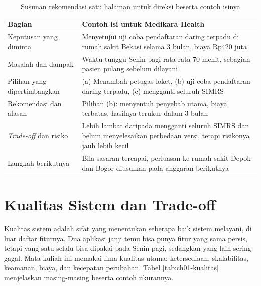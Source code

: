 \begin{table}[!htb]
  \centering
  \footnotesize
  \caption{Susunan rekomendasi satu halaman untuk direksi beserta contoh isinya}
  \label{tab:ch01-rekomendasi}
  \begin{tabularx}{\textwidth}{P{2.6cm}L}
    \hline
    \textbf{Bagian} & \textbf{Contoh isi untuk Medikara Health} \\
    \hline
    Keputusan yang diminta & Menyetujui uji coba pendaftaran daring terpadu di rumah
      sakit Bekasi selama 3 bulan, biaya Rp420 juta \\
    \hline
    Masalah dan dampak & Waktu tunggu Senin pagi rata-rata 70 menit, sebagian pasien
      pulang sebelum dilayani \\
    \hline
    Pilihan yang dipertimbangkan & (a) Menambah petugas loket, (b) uji coba pendaftaran
      daring terpadu, (c) mengganti seluruh SIMRS \\
    \hline
    Rekomendasi dan alasan & Pilihan (b): menyentuh penyebab utama, biaya terbatas,
      hasilnya terukur dalam 3 bulan \\
    \hline
    \textit{Trade-off} dan risiko & Lebih lambat daripada mengganti seluruh SIMRS dan
      belum menyelesaikan perbedaan versi, tetapi risikonya jauh lebih kecil \\
    \hline
    Langkah berikutnya & Bila sasaran tercapai, perluasan ke rumah sakit Depok dan Bogor
      diusulkan pada anggaran berikutnya \\
    \hline
  \end{tabularx}
\end{table}

\section{Kualitas Sistem dan Trade-off}

Kualitas sistem adalah sifat yang menentukan seberapa baik sistem melayani, di luar
daftar fiturnya. Dua aplikasi janji temu bisa punya fitur yang sama persis, tetapi yang
satu selalu bisa dipakai pada Senin pagi, sedangkan yang lain sering gagal. Mata kuliah
ini memakai lima kualitas utama: ketersediaan, skalabilitas, keamanan, biaya, dan
kecepatan perubahan. Tabel \ref{tab:ch01-kualitas} menjelaskan masing-masing beserta
contoh ukurannya.

